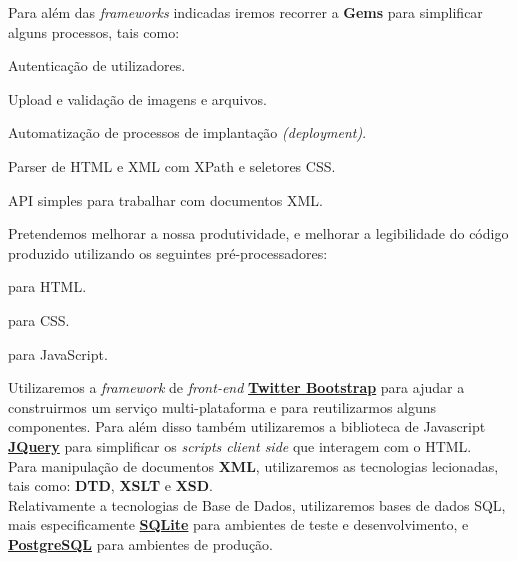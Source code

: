Para além das \textit{frameworks} indicadas iremos recorrer a \textbf{Gems} para simplificar alguns processos, tais como:

\begin{description}[labelindent=1cm]
  \item[Devise] Autenticação de utilizadores.
  \item[Paperclip] Upload e validação de imagens e arquivos.
  \item[Capistrano] Automatização de processos de implantação \textit{(deployment)}.
  \item[Nokogiri] Parser de HTML e XML com XPath e seletores CSS.
  \item[XML-Simple] API simples para trabalhar com documentos XML.
\end{description} 

Pretendemos melhorar a nossa produtividade, e melhorar a legibilidade do código produzido utilizando os seguintes pré-processadores:

\begin{description}[labelindent=1cm]
  \item[\href{http://slim-lang.com/}{Slim}] para HTML.
  \item[\href{http://sass-lang.com/}{SASS}] para CSS.
  \item[\href{http://coffeescript.org/}{CoffeeScript}] para JavaScript.
\end{description} 

Utilizaremos a \textit{framework} de \textit{front-end} \href{http://getbootstrap.com/}{\textbf{Twitter Bootstrap}} 
para ajudar a construirmos um serviço multi-plataforma e para reutilizarmos alguns componentes.
Para além disso também utilizaremos a biblioteca de Javascript \href{http://jquery.com/}{\textbf{JQuery}} para simplificar os \textit{scripts client side} que interagem com o HTML.\\

Para manipulação de documentos \textbf{XML}, utilizaremos as tecnologias lecionadas, tais como: \textbf{DTD}, \textbf{XSLT} e \textbf{XSD}.\\

Relativamente a tecnologias de Base de Dados, utilizaremos bases de dados SQL, mais especificamente \href{http://www.sqlite.org/}{\textbf{SQLite}} 
para ambientes de teste e desenvolvimento, e \href{http://www.postgresql.org/}{\textbf{PostgreSQL}} para ambientes de produção.

\newpage

